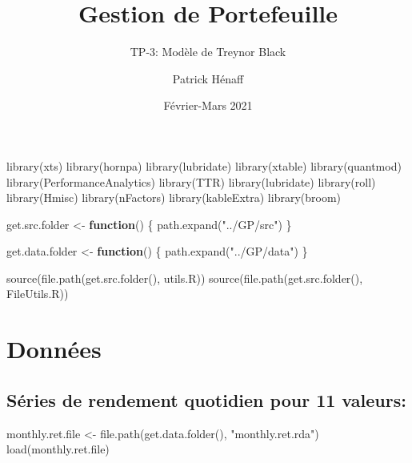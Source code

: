 \documentclass[
]{article}
\title{Gestion de Portefeuille}
\subtitle{TP-3: Modèle de Treynor Black}
\author{Patrick Hénaff}
\date{Février-Mars 2021}
\newenvironment{Shaded}{\begin{snugshade}}{\end{snugshade}}
\newcommand{\ControlFlowTok}[1]{\textcolor[rgb]{0.13,0.29,0.53}{\textbf{#1}}}
\newcommand{\FunctionTok}[1]{\textcolor[rgb]{0.00,0.00,0.00}{#1}}
\newcommand{\NormalTok}[1]{#1}
\newcommand{\OtherTok}[1]{\textcolor[rgb]{0.56,0.35,0.01}{#1}}
\newcommand{\StringTok}[1]{\textcolor[rgb]{0.31,0.60,0.02}{#1}}
\begin{document}
\maketitle

\begin{Shaded}
\begin{Highlighting}[]
\FunctionTok{library}\NormalTok{(xts)}
\FunctionTok{library}\NormalTok{(hornpa)}
\FunctionTok{library}\NormalTok{(lubridate)}
\FunctionTok{library}\NormalTok{(xtable)}
\FunctionTok{library}\NormalTok{(quantmod)}
\FunctionTok{library}\NormalTok{(PerformanceAnalytics)}
\FunctionTok{library}\NormalTok{(TTR)}
\FunctionTok{library}\NormalTok{(lubridate)}
\FunctionTok{library}\NormalTok{(roll)}
\FunctionTok{library}\NormalTok{(Hmisc)}
\FunctionTok{library}\NormalTok{(nFactors)}
\FunctionTok{library}\NormalTok{(kableExtra)}
\FunctionTok{library}\NormalTok{(broom)}

\NormalTok{get.src.folder }\OtherTok{\textless{}{-}} \ControlFlowTok{function}\NormalTok{() \{}
  \FunctionTok{path.expand}\NormalTok{(}\StringTok{"../GP/src"}\NormalTok{)}
\NormalTok{\}}

\NormalTok{get.data.folder }\OtherTok{\textless{}{-}} \ControlFlowTok{function}\NormalTok{() \{}
  \FunctionTok{path.expand}\NormalTok{(}\StringTok{"../GP/data"}\NormalTok{)}
\NormalTok{\}}

\FunctionTok{source}\NormalTok{(}\FunctionTok{file.path}\NormalTok{(}\FunctionTok{get.src.folder}\NormalTok{(), }\StringTok{\textquotesingle{}utils.R\textquotesingle{}}\NormalTok{))}
\FunctionTok{source}\NormalTok{(}\FunctionTok{file.path}\NormalTok{(}\FunctionTok{get.src.folder}\NormalTok{(), }\StringTok{\textquotesingle{}FileUtils.R\textquotesingle{}}\NormalTok{))}
\end{Highlighting}
\end{Shaded}

\hypertarget{donnuxe9es}{%
\section{Données}\label{donnuxe9es}}

\hypertarget{suxe9ries-de-rendement-quotidien-pour-11-valeurs}{%
\subsection{Séries de rendement quotidien pour 11
valeurs:}\label{suxe9ries-de-rendement-quotidien-pour-11-valeurs}}

\begin{Shaded}
\begin{Highlighting}[]
\NormalTok{monthly.ret.file }\OtherTok{\textless{}{-}} \FunctionTok{file.path}\NormalTok{(}\FunctionTok{get.data.folder}\NormalTok{(), }\StringTok{"monthly.ret.rda"}\NormalTok{)}
\FunctionTok{load}\NormalTok{(monthly.ret.file)}
\end{Highlighting}
\end{Shaded}
\end{document}
